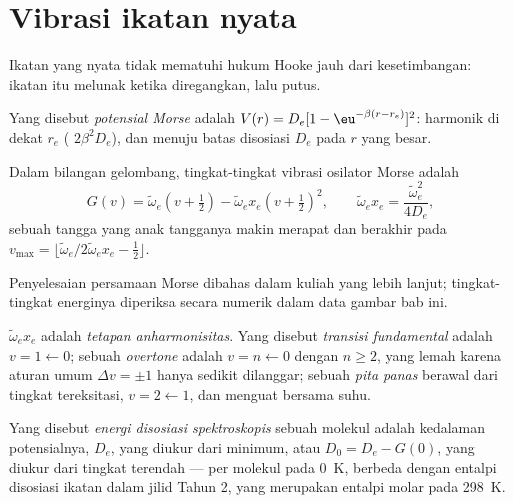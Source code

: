 \section{Vibrasi ikatan nyata}\label{sec:b3:rovibrational-spectroscopy:real-bonds}

Ikatan yang nyata tidak mematuhi hukum Hooke jauh dari kesetimbangan: ikatan
itu melunak ketika diregangkan, lalu putus.

\begin{definition}\label{def:b3:rovibrational-spectroscopy:morse}
Yang disebut \emph{potensial Morse} adalah $V(r) = D_e[1 -
\eu^{-\beta(r - r_e)}]^2$: harmonik di dekat $r_e$ ( $2\beta^2D_e$),
dan menuju batas disosiasi $D_e$ pada $r$ yang besar.
\end{definition}

\begin{proposition}\label{prop:b3:rovibrational-spectroscopy:morse-levels}
Dalam bilangan gelombang, tingkat-tingkat vibrasi osilator Morse adalah
\[
G(v) = \tilde\omega_e(v + \tfrac12) - \tilde\omega_ex_e(v + \tfrac12)^2, \qquad
\tilde\omega_ex_e = \frac{\tilde\omega_e^2}{4D_e},
\]
sebuah tangga yang anak tangganya makin merapat dan berakhir pada
$v_{\max} = \lfloor\tilde\omega_e/
2\tilde\omega_ex_e - \frac12\rfloor$.
\end{proposition}
\admitted

Penyelesaian persamaan Morse dibahas dalam kuliah yang lebih lanjut;
tingkat-tingkat energinya diperiksa secara numerik dalam data gambar bab ini.

\begin{definition}\label{def:b3:rovibrational-spectroscopy:anharmonic}
$\tilde\omega_ex_e$ adalah \emph{tetapan anharmonisitas}.
Yang disebut \emph{transisi fundamental} adalah
$v = 1 \leftarrow 0$; sebuah \emph{overtone} adalah
$v = n \leftarrow 0$ dengan $n \ge 2$, yang lemah karena aturan umum
$\Delta v = \pm1$  hanya sedikit dilanggar; sebuah
\emph{pita panas} berawal dari tingkat tereksitasi,
$v = 2 \leftarrow 1$, dan menguat bersama suhu.
\end{definition}

\begin{definition}\label{def:b3:rovibrational-spectroscopy:dissociation}
Yang disebut \emph{energi disosiasi
spektroskopis} sebuah molekul adalah kedalaman potensialnya, $D_e$, yang
diukur dari minimum, atau $D_0 = D_e - G(0)$, yang diukur dari tingkat
terendah --- per molekul pada \qty{0}{K}, berbeda dengan entalpi disosiasi
ikatan dalam jilid Tahun 2, yang merupakan entalpi molar pada \qty{298}{K}.
\end{definition}

